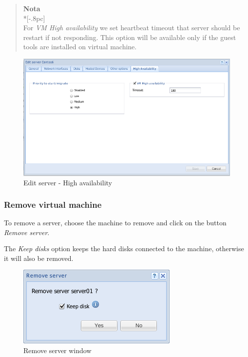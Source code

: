 \begin{description}
                \begin{quote}
                    {\large \bf Nota} \\*[-.8pc]
                    \underline{\hspace{6in}} \\
                    For \emph{VM High availability} we set heartbeat timeout that server should be restart if not responding.
                        This option will be available only if the guest tools are installed on virtual machine.
                \end{quote}
                    
		\begin{figure}[H]
        		\begin{center}
		        \includegraphics[scale=0.5]{screenshots/server_edit_ha.png}
        		\caption{Edit server - High availability}
	        	\label{fig:server_edit_ha}
	        	\end{center}
		\end{figure}

\end{description}



\subsubsection{Remove virtual machine}
\label{sec:remove_server}
To remove a server, choose the machine to remove and click on the button \emph{Remove server}.

The \emph{Keep disks} option keeps the hard disks connected to the machine, otherwise it will also be removed.
		
\begin{figure}[H]
	\begin{center}
	\includegraphics[scale=0.5]{screenshots/server_remove.png}
	\caption{Remove server window}
	\label{fig:server_remove}
	\end{center}
\end{figure}


